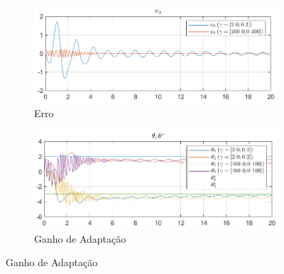 \documentclass[10pt]{article}
\begin{document}
\begin{figure}[h!]
    \centering
    \begin{subfigure}[b]{0.45\textwidth}
        \centering
        \includegraphics[width=\textwidth]{img/fig08a.png}
        \caption{Erro}
    \end{subfigure}
    \begin{subfigure}[b]{0.45\textwidth}
        \centering
        \includegraphics[width=\textwidth]{img/fig08b.png}
        \caption{Ganho de Adaptação}
    \end{subfigure}

    \vspace{0.5cm}


\end{figure}
\end{document}
